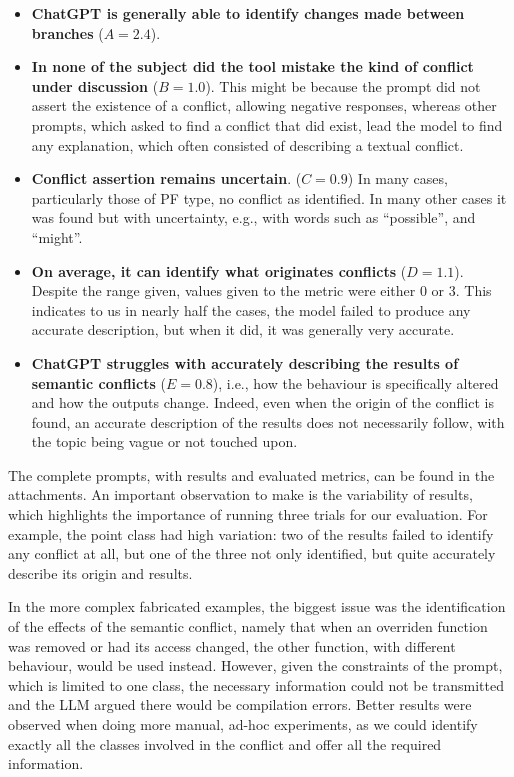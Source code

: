 \begin{itemize}
  \item \textbf{ChatGPT is generally able to identify changes made between branches} ($A=2.4$).

  \item \textbf{In none of the subject did the tool mistake the kind of conflict under discussion} ($B=1.0$). This might be because the prompt did not assert the existence of a conflict, allowing negative responses, whereas other prompts, which asked to find a conflict that did exist, lead the model to find any explanation, which often consisted of describing a textual conflict.

  \item \textbf{Conflict assertion remains uncertain}. ($C=0.9$) In many cases, particularly those of PF type, no conflict as identified. In many other cases it was found but with uncertainty, e.g., with words such as ``possible'', and ``might''.

  \item \textbf{On average, it can identify what originates conflicts} ($D=1.1$).  Despite the range given, values given to the metric were either 0 or 3. This indicates to us in nearly half the cases, the model failed to produce any accurate description, but when it did, it was generally very accurate.

  \item \textbf{ChatGPT struggles with accurately describing the results of semantic conflicts} ($E=0.8$), i.e., how the behaviour is specifically altered and how the outputs change. Indeed, even when the origin of the conflict is found, an accurate description of the results does not necessarily follow, with the topic being vague or not touched upon.
\end{itemize}

The complete prompts, with results and evaluated metrics, can be found in the attachments.
An important observation to make is the variability of results, which highlights the importance of running three trials for our evaluation.
For example, the point class had high variation: two of the results failed to identify any conflict at all, but one of the three not only identified, but quite accurately describe its origin and results.

In the more complex fabricated examples, the biggest issue was the identification of the effects of the semantic conflict, namely that when an overriden function was removed or had its access changed, the other function, with different behaviour, would be used instead. However, given the constraints of the prompt, which is limited to one class, the necessary information could not be transmitted and the LLM argued there would be compilation errors. 
Better results were observed when doing more manual, ad-hoc experiments, as we could identify exactly all the classes involved in the conflict and offer all the required information.


